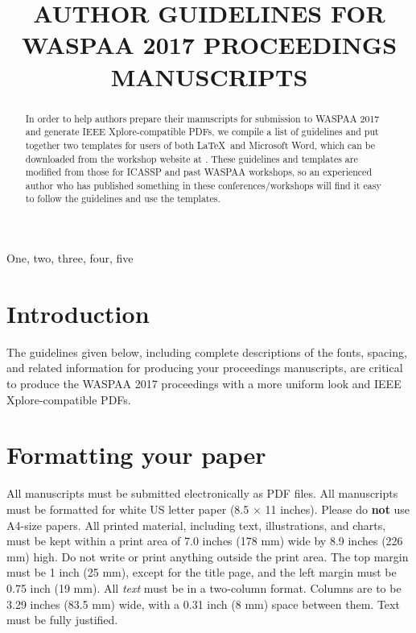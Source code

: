 \documentclass{article}
\title{AUTHOR GUIDELINES FOR WASPAA 2017 PROCEEDINGS MANUSCRIPTS}
\begin{document}
\ninept
\maketitle

\begin{sloppy}

\begin{abstract}
  In order to help authors prepare their manuscripts for 
  submission to WASPAA 2017 and generate IEEE Xplore-compatible 
  PDFs, we compile a list of guidelines and put together two
  templates for users of both \LaTeX\ and Microsoft Word, which
  can be downloaded from the workshop website at \cite{waspaa17web}.
  These guidelines and templates are modified from those for 
  ICASSP and past WASPAA workshops, so an experienced author who 
  has published something in these conferences/workshops will 
  find it easy to follow the guidelines and use the templates.
\end{abstract}

\begin{keywords}
One, two, three, four, five
\end{keywords}

\section{Introduction}
\label{sec:intro}

The guidelines given below, including complete descriptions of 
the fonts, spacing, and related information for producing your 
proceedings manuscripts, are critical to produce the WASPAA 2017 
proceedings with a more uniform look and IEEE Xplore-compatible PDFs. 

\section{Formatting your paper}
\label{sec:format}

All manuscripts must be submitted electronically as PDF files. 
All manuscripts must be formatted for white US letter paper 
(8.5 $\times$ 11 inches). Please do {\bf not} use A4-size papers. 
All printed material, including text, illustrations, and charts, 
must be kept within a print area of 7.0 inches (178 mm) wide 
by 8.9 inches (226 mm) high. Do not write or print anything outside 
the print area. The top margin must be 1 inch (25 mm), except for 
the title page, and the left margin must be 0.75 inch (19 mm).  
All {\it text} must be in a two-column format. Columns are to be 
3.29 inches (83.5 mm) wide, with a 0.31 inch (8 mm) space between 
them. Text must be fully justified. 


\end{sloppy}
\end{document}
